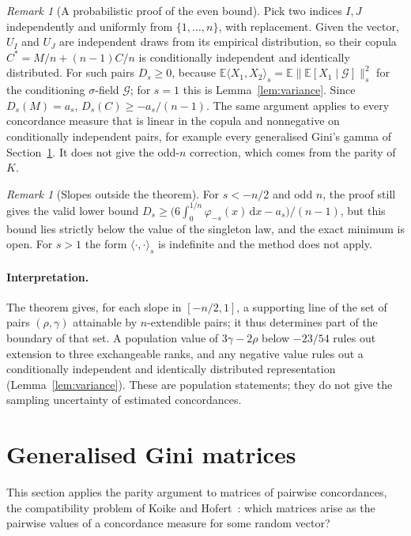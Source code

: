 \documentclass[11pt,a4paper]{article}
\theoremstyle{remark}
\newtheorem{remark}[theorem]{Remark}
\newcommand{\EE}{\mathbb{E}}
\newcommand{\dd}{\,\mathrm d}
\begin{document}
\begin{remark}[A probabilistic proof of the even bound]\label{rem:mixture}
Pick two indices $I,J$ independently and uniformly from $\{1,\ldots,n\}$, with replacement. Given the vector, $U_I$ and $U_J$ are independent draws from its empirical distribution, so their copula $C^*=M/n+(n-1)C/n$ is conditionally independent and identically distributed. For such pairs $D_s\geq0$, because $\EE\langle X_1,X_2\rangle_s=\EE\|\EE[X_1\mid\mathcal G]\|_s^2$ for the conditioning $\sigma$-field $\mathcal G$; for $s=1$ this is Lemma~\ref{lem:variance}. Since $D_s(M)=a_s$, $D_s(C)\geq-a_s/(n-1)$. The same argument applies to every concordance measure that is linear in the copula and nonnegative on conditionally independent pairs, for example every generalised Gini's gamma of Section~\ref{sec:gini}. It does not give the odd-$n$ correction, which comes from the parity of $K$.
\end{remark}

\begin{remark}[Slopes outside the theorem]\label{rem:slopes}
For $s<-n/2$ and odd $n$, the proof still gives the valid lower bound $D_s\geq\big(6\int_0^{1/n}\varphi_{-s}(x)\dd x-a_s\big)/(n-1)$, but this bound lies strictly below the value of the singleton law, and the exact minimum is open. For $s>1$ the form $\langle\cdot,\cdot\rangle_s$ is indefinite and the method does not apply.
\end{remark}

\paragraph{Interpretation.} The theorem gives, for each slope in $[-n/2,1]$, a supporting line of the set of pairs $(\rho,\gamma)$ attainable by $n$-extendible pairs; it thus determines part of the boundary of that set. A population value of $3\gamma-2\rho$ below $-23/54$ rules out extension to three exchangeable ranks, and any negative value rules out a conditionally independent and identically distributed representation (Lemma~\ref{lem:variance}). These are population statements; they do not give the sampling uncertainty of estimated concordances.

\section{Generalised Gini matrices}\label{sec:gini}
This section applies the parity argument to matrices of pairwise concordances, the compatibility problem of Koike and Hofert~\cite{kh}: which matrices arise as the pairwise values of a concordance measure for some random vector?
\end{document}
